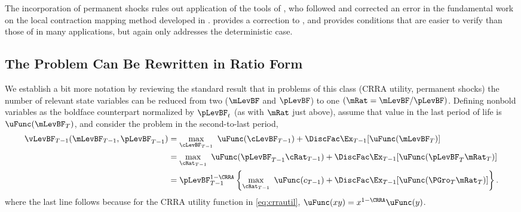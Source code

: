 \documentclass[BufferStockTheory]{subfiles}
\begin{document}
The incorporation of permanent shocks rules out application of the tools of \cite{mnUnique}, who followed and corrected an error in the fundamental work on the local contraction mapping method developed in \cite{rrExistence}.  \cite{mvExistence} provides a correction to \cite{rrExistence}, and provides conditions that are easier to verify than those of \cite{rrExistence} in many applications, but again only addresses the deterministic case.  

\hypertarget{The-Problem-Can-Be-Rewritten-in-Ratio-Form}{}
\subsection{The Problem Can Be Rewritten in Ratio Form}

\label{subsec:ratio}

We establish a bit more notation by reviewing the standard result that in problems of this class (CRRA utility, permanent shocks) the number of relevant state variables can be reduced from two ($\mLevBF$ and $\pLevBF$) to one $(\mRat = \mLevBF/\pLevBF)$.  Defining nonbold variables as the boldface counterpart normalized by $\pLevBF_{t}$ (as with $\mRat$ just above), assume that value in the last period of life is $\uFunc(\mLevBF_{T})$, and consider the problem in the second-to-last period,
\begin{align}
  \vLevBF_{T-1}(\mLevBF_{T-1},\pLevBF_{T-1})  & = 
                                                \max_{\cLevBF_{T-1}}~ \uFunc(\cLevBF_{T-1}) +\DiscFac \Ex_{T-1} [ \uFunc(\mLevBF_{T})]
                                                \notag \\
                                              & =  \max_{\cRat_{T-1}}~
                                                \uFunc(\pLevBF_{T-1}\cRat_{T-1}) + \DiscFac  \Ex_{T-1} [\uFunc(\pLevBF_{T}{\mRat}
                                                _{T})]  \notag \\
                                              & = \pLevBF_{T-1}^{1-\CRRA}
                                                \left\{\max_{\cRat_{T-1}}~ \uFunc(c_{T-1}) + \DiscFac \Ex_{T-1} [ \uFunc( {\PGro}_{T}
                                                {\mRat}_{T}) ] \right\}  . \label{eq:vBold}
\end{align}
where the last line follows because for the CRRA utility function in \eqref{eq:crrautil}, $\uFunc(xy) =
x^{1-\CRRA}\uFunc(y)$.
\end{document}
